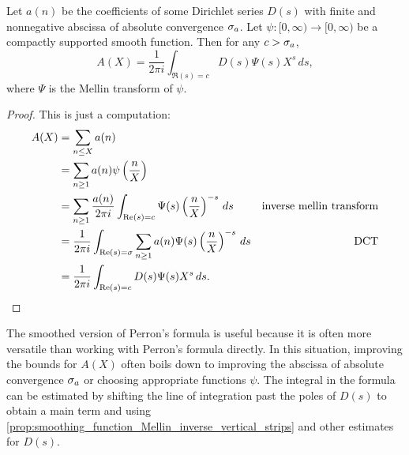       \begin{theorem}\label{thm:Perron's_formula_with_test_function
      }
        Let $a(n)$ be the coefficients of some Dirichlet series $D(s)$ with finite and nonnegative abscissa of absolute convergence $\sigma_{a}$. Let $\psi:[0,\infty) \to [0,\infty)$ be a compactly supported smooth function. Then for any $c > \sigma_{a}$,
        \[
          A(X) = \frac{1}{2\pi i}\int_{\Re(s) = c}D(s)\Psi(s)X^{s}\,ds,
        \]
        where $\Psi$ is the Mellin transform of $\psi$.
      \end{theorem}
      \begin{proof}
        This is just a computation:
        \begin{align*}
          A(X) &= \sum_{n \le X}a(n) \\
          &= \sum_{n \ge 1}a(n)\psi\left(\frac{n}{X}\right) \\
          &= \sum_{n \ge 1}\frac{a(n)}{2\pi i}\int_{\mathrm{Re}(s) = c}\Psi(s)\left(\frac{n}{X}\right)^{-s}\,ds & \text{inverse mellin transform} \\
          &= \frac{1}{2\pi i}\int_{\mathrm{Re}(s) = \sigma}\sum_{n \ge 1}a(n)\Psi(s)\left(\frac{n}{X}\right)^{-s}\,ds & \text{DCT} \\
          &= \frac{1}{2\pi i}\int_{\mathrm{Re}(s) = c}D(s)\Psi(s)X^{s}\,ds. \\
      \end{align*}
      \end{proof}

      The smoothed version of Perron's formula is useful because it is often more versatile than working with Perron's formula directly. In this situation, improving the bounds for $A(X)$ often boils down to improving the abscissa of absolute convergence $\sigma_{a}$ or choosing appropriate functions $\psi$. The integral in the formula can be estimated by shifting the line of integration past the poles of $D(s)$ to obtain a main term and using \cref{prop:smoothing_function_Mellin_inverse_vertical_strips} and other estimates for $D(s)$.
